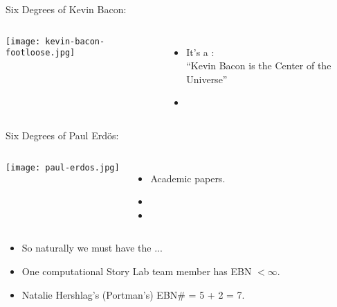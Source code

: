 \begin{frame}

  \begin{block}{Six Degrees of Kevin Bacon:}
    \begin{columns}
      \texttt{[image: kevin-bacon-footloose.jpg]}
      \begin{itemize}
      \item
        It's a
        :\\
        ``Kevin Bacon is the Center of the Universe''
      \item 
      \end{itemize}
    \end{columns}
  \end{block}
  
  \begin{block}{Six Degrees of Paul Erd\"{o}s:}
    \begin{columns}
      \texttt{[image: paul-erdos.jpg]}
      \begin{itemize}
      \item 
        Academic papers.
      \item
      \item
      \end{itemize}
    \end{columns}
  \end{block}

  \begin{block}{}
    \begin{itemize}
    \item<2->
      So naturally we must have the
       ...
    \item<3->
      One computational Story Lab team member has EBN $< \infty$.
    \item<4->
      Natalie Hershlag's (Portman's) EBN\# = 5 + 2 = 7.
    \end{itemize}
  \end{block}

\end{frame}

